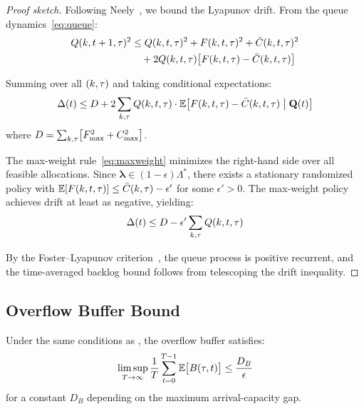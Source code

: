 \begin{proof}[Proof sketch]
Following Neely~\cite[Ch.~4]{neely2010stochastic}, we bound the Lyapunov drift.
From the queue dynamics~\eqref{eq:queue}:
\begin{align}
Q(k, t+1, \tau)^2 &\leq Q(k, t, \tau)^2
    + F(k, t, \tau)^2 + \bar{C}(k, t, \tau)^2 \notag \\
    &\quad + 2Q(k, t, \tau)\bigl[F(k, t, \tau) - \bar{C}(k, t, \tau)\bigr]
\end{align}

Summing over all $(k, \tau)$ and taking conditional expectations:
\begin{equation}
\Delta(t) \leq D + 2 \sum_{k, \tau} Q(k, t, \tau) \cdot
\mathbb{E}\bigl[F(k, t, \tau) - \bar{C}(k, t, \tau) \;\big|\; \mathbf{Q}(t)\bigr]
\end{equation}
where $D = \sum_{k,\tau} \bigl[F_{\max}^2 + C_{\max}^2\bigr]$.

The max-weight rule~\eqref{eq:maxweight} minimizes the right-hand side over all
feasible allocations. Since $\boldsymbol{\lambda} \in (1-\epsilon)\Lambda^*$,
there exists a stationary randomized policy with $\mathbb{E}[F(k,t,\tau)] \leq
\bar{C}(k,\tau) - \epsilon'$ for some $\epsilon' > 0$. The max-weight
policy achieves drift at least as negative, yielding:
\begin{equation}
\Delta(t) \leq D - \epsilon' \sum_{k,\tau} Q(k, t, \tau)
\end{equation}

By the Foster--Lyapunov criterion~\cite{meyn2009markov}, the queue process
is positive recurrent, and the time-averaged backlog bound follows from
telescoping the drift inequality.
\end{proof}

\subsection{Overflow Buffer Bound}

\begin{theorem}
\label{thm:buffer}
Under the same conditions as , the overflow buffer satisfies:
\begin{equation}
\limsup_{T \to \infty} \frac{1}{T} \sum_{t=0}^{T-1}
\mathbb{E}\bigl[B(\tau, t)\bigr] \leq \frac{D_B}{\epsilon}
\end{equation}
for a constant $D_B$ depending on the maximum arrival-capacity gap.
\end{theorem}

